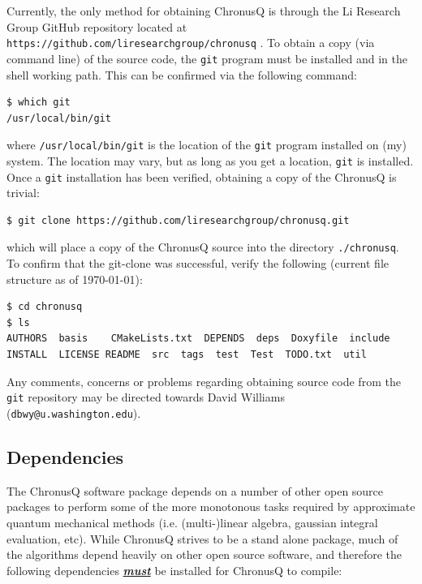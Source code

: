 \documentclass[12pt]{article}
\begin{document}
Currently, the only method for obtaining ChronusQ is through the Li Research Group GitHub repository located
at \texttt{https://github.com/liresearchgroup/chronusq} . To obtain a copy (via command line) of the source code, the \texttt{git} program must be installed and in the shell working path. This can be confirmed via the following command:

\begin{lstlisting}
$ which git
/usr/local/bin/git
\end{lstlisting}
where \texttt{/usr/local/bin/git} is the location of the \texttt{git} program installed on (my) system. The location may vary, but as long as you get a location, \texttt{git} is installed. Once a \texttt{git} installation has been verified, obtaining a copy of the ChronusQ is trivial:

\begin{lstlisting}
$ git clone https://github.com/liresearchgroup/chronusq.git
\end{lstlisting}
which will place a copy of the ChronusQ source into the directory \texttt{./chronusq}. To confirm that the git-clone was successful, verify the following (current file structure as of \today):

\begin{lstlisting}
$ cd chronusq
$ ls
AUTHORS  basis    CMakeLists.txt  DEPENDS  deps  Doxyfile  include  
INSTALL  LICENSE README  src  tags  test  Test  TODO.txt  util
\end{lstlisting}
Any comments, concerns or problems regarding obtaining source code from the \texttt{git} repository may be directed towards David Williams (\texttt{dbwy@u.washington.edu}).

\subsection{Dependencies} \label{subsec:deps}

The ChronusQ software package depends on a number of other open source packages to perform some of the more monotonous tasks required by approximate quantum mechanical methods (i.e. (multi-)linear algebra, gaussian integral evaluation, etc). While ChronusQ strives to be a stand alone package, much of the algorithms depend heavily on other open source software, and therefore the following dependencies \textbf{\textit{\underline{must}}} be installed for ChronusQ to compile:
\end{document}
